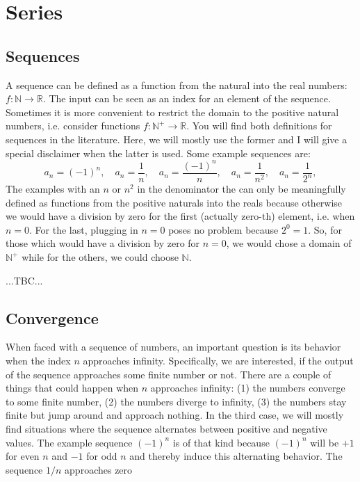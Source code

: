 \section{Series}

\subsection{Sequences}
A sequence can be defined as a function from the natural into the real numbers: $f: \mathbb{N} \rightarrow \mathbb{R}$. The input can be seen as an index for an element of the sequence. Sometimes it is more convenient to restrict the domain to the positive natural numbers, i.e. consider functions $f: \mathbb{N}^+ \rightarrow \mathbb{R}$. You will find both definitions for sequences in the literature. Here, we will mostly use the former and I will give a special disclaimer when the latter is used. Some example sequences are:
\begin{equation}
 a_n = (-1)^n,           \quad 
 a_n = \frac{1}{n},      \quad
 a_n = \frac{(-1)^n}{n}, \quad 
 a_n = \frac{1}{n^2},    \quad
 a_n = \frac{1}{2^n},   
\end{equation}
The examples with an $n$ or $n^2$ in the denominator the can only be meaningfully defined as functions from the positive naturals into the reals because otherwise we would have a division by zero for the first (actually zero-th) element, i.e. when $n=0$. For the last, plugging in $n=0$ poses no problem because $2^0=1$. So, for those which would have a division by zero for $n=0$, we would chose a domain of $\mathbb{N}^+$ while for the others, we could choose $\mathbb{N}$. 

...TBC...

\subsection{Convergence}
When faced with a sequence of numbers, an important question is its behavior when the index $n$ approaches infinity. Specifically, we are interested, if the output of the sequence approaches some finite number or not. There are a couple of things that could happen when $n$ approaches infinity: (1) the numbers converge to some finite number, (2) the numbers diverge to infinity, (3) the numbers stay finite but jump around and approach nothing. In the third case, we will mostly find situations where the sequence alternates between positive and negative values. The example sequence $(-1)^n$ is of that kind because $(-1)^n$ will be $+1$ for even $n$ and $-1$ for odd $n$ and thereby induce this alternating behavior. The sequence $1/n$ approaches zero

